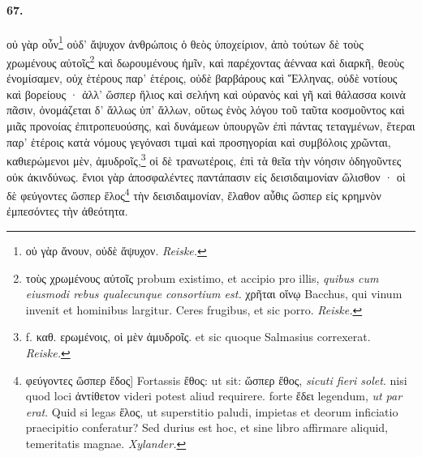 \documentclass[a4paper, 11pt, oneside, polutonikogreek, german, landscape]{article}
\begin{document}
\paragraph{67.}
οὐ γὰρ οὖν\footnote{οὐ γὰρ ἄνουν, οὐδὲ ἄψυχον. \emph{Reiske.}} οὐδ' ἄψυχον ἀνθρώποις ὁ θεὸς ὑποχείριον, ἀπὸ τούτων δὲ τοὺς χρωμένους αὐτοῖς\footnote{τοὺς χρωμένους αὐτοῖς probum existimo, et accipio pro illis, \emph{quibus cum eiusmodi rebus qualecunque consortium est.} χρῆται οἴνῳ Bacchus, qui vinum invenit et hominibus largitur. Ceres frugibus, et sic porro. \emph{Reiske.}} καὶ δωρουμένους ἡμῖν, καὶ παρέχοντας ἀένναα καὶ διαρκῆ, θεοὺς ἐνομίσαμεν, οὐχ ἑτέρους παρ' ἑτέροις, οὐδὲ βαρβάρους καὶ Ἕλληνας, οὐδὲ νοτίους καὶ βορείους · ἀλλ' ὥσπερ ἥλιος καὶ σελήνη καὶ οὐρανὸς καὶ γῆ καὶ θάλασσα κοινὰ πᾶσιν, ὀνομάζεται δ' ἄλλως ὑπ' ἄλλων, οὕτως ἑνὸς λόγου τοῦ ταῦτα κοσμοῦντος καὶ μιᾶς προνοίας ἐπιτροπευούσης, καὶ δυνάμεων ὑπουργῶν ἐπὶ πάντας τεταγμένων, ἕτεραι παρ' ἑτέροις κατὰ νόμους γεγόνασι τιμαὶ καὶ προσηγορίαι καὶ συμβόλοις χρῶνται, καθιερώμενοι μὲν, ἀμυδροῖς,\footnote{f. καθ. ερωμένοις, οἱ μὲν ἀμυδροῖς. et sic quoque Salmasius correxerat. \emph{Reiske.}} οἱ δὲ τρανωτέροις, ἐπὶ τὰ θεῖα τὴν νόησιν ὁδηγοῦντες οὐκ ἀκινδύνως. ἔνιοι γὰρ ἀποσφαλέντες παντάπασιν εἰς δεισιδαιμονίαν ὤλισθον · οἱ δὲ φεύγοντες ὥσπερ ἕλος\footnote{φεύγοντες ὥσπερ ἔδος] Fortassis ἔθος: ut sit: ὥσπερ ἔθος, \emph{sicuti fieri solet}. nisi quod loci ἀντίθετον videri potest aliud requirere. forte ἔδει legendum, \emph{ut par erat}. Quid si legas ἕλος, ut superstitio paludi, impietas et deorum inficiatio praecipitio conferatur? Sed durius est hoc, et sine libro affirmare aliquid, temeritatis magnae. \emph{Xylander.} } τὴν δεισιδαιμονίαν, ἔλαθον αὖθις ὥσπερ εἰς κρημνὸν ἐμπεσόντες τὴν ἀθεότητα.
\end{document}
